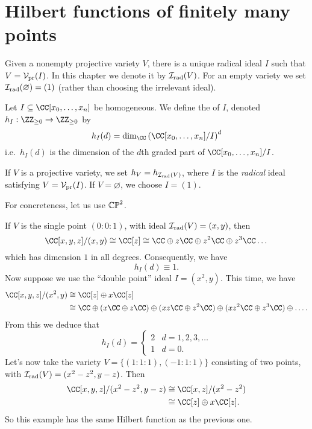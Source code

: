 \section{Hilbert functions of finitely many points}
\begin{definition}
	Given a nonempty projective variety $V$, there is a unique
	radical ideal $I$ such that $V = \mathcal V_{\text{pr}}(I)$.
	In this chapter we denote it by $\mathcal I_{\text{rad}}(V)$.
	For an empty variety we set $\mathcal I_{\text{rad}}(\varnothing) = (1)$
	(rather than choosing the irrelevant ideal).
\end{definition}
\begin{definition}
	Let $I \subseteq \CC[x_0, \dots, x_n]$ be homogeneous.
	We define the  of $I$,
	denoted $h_I : \ZZ_{\ge 0} \to \ZZ_{\ge 0}$ by
	\[ h_I(d) = \dim_{\CC} \left( \CC[x_0, \dots, x_n]/I \right)^d \]
	i.e.\ $h_I(d)$ is the dimension of the $d$th graded part of
	$\CC[x_0, \dots, x_n] / I$.
\end{definition}
\begin{definition}
	If $V$ is a projective variety, we set $h_V = h_{\mathcal I_{\text{rad}}(V)}$,
	where $I$ is the \emph{radical} ideal satisfying $V = \mathcal V_{\text{pr}}(I)$.
	If $V = \varnothing$, we choose $I = (1)$.
\end{definition}
\begin{example}
	\label{ex:hilbert_zero}
	For concreteness, let us use $\mathbb{CP}^2$.
	\begin{enumerate}[(a)]
		\ii If $V$ is the single point $(0:0:1)$,
		with ideal $\mathcal I_{\text{rad}}(V) = (x,y)$,
		then 
		\[ \CC[x,y,z] / (x,y) \cong \CC[z]
		\cong \CC \oplus z\CC \oplus z^2\CC \oplus z^3\CC \dots \]
		which has dimension $1$ in all degrees.
		Consequently, we have \[ h_I(d) \equiv 1. \]
		\ii Now suppose we use the ``double point'' ideal $I = (x^2,y)$.
		This time, we have
		\begin{align*}
			\CC[x,y,z] / (x^2,y)
			&\cong \CC[z] \oplus x\CC[z] \\
			&\cong \CC \oplus (x\CC \oplus z\CC) \oplus (xz\CC \oplus z^2\CC)
			\oplus (xz^2\CC \oplus z^3\CC) \oplus\dots.
		\end{align*}
		From this we deduce that
		\[
			h_I(d) =
			\begin{cases}
				2 & d = 1, 2, 3, \dots \\
				1 & d = 0.
			\end{cases}
		\]
		\ii Let's now take the variety $V = \{(1:1:1), (-1:1:1)\}$
		consisting of two points, with $\mathcal I_{\text{rad}}(V) = (x^2-z^2, y-z)$. Then
		\begin{align*}
			\CC[x,y,z] / (x^2-z^2,y-z)
			&\cong \CC[x,z] / (x^2-z^2) \\
			&\cong \CC[z] \oplus x\CC[z].
		\end{align*}
		So this example has the same Hilbert function as the previous one.
	\end{enumerate}
\end{example}
